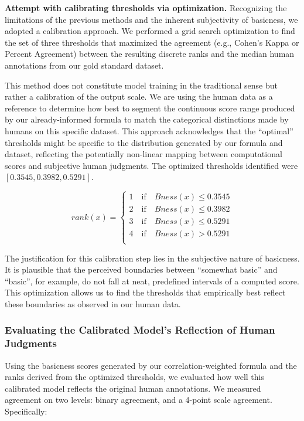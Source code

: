 \documentclass[preprint,12pt,authoryear]{elsarticle}
\begin{document}
\textbf{Attempt with calibrating thresholds via optimization.} Recognizing the limitations of the previous methods and the inherent subjectivity of basicness, we adopted a calibration approach. We performed a grid search optimization to find the set of three thresholds that maximized the agreement (e.g., Cohen's Kappa or Percent Agreement) between the resulting discrete ranks and the median human annotations from our gold standard dataset.

This method does not constitute model training in the traditional sense but rather a calibration of the output scale. We are using the human data as a reference to determine how best to segment the continuous score range produced by our already-informed formula to match the categorical distinctions made by humans on this specific dataset. This approach acknowledges that the ``optimal'' thresholds might be specific to the distribution generated by our formula and dataset, reflecting the potentially non-linear mapping between computational scores and subjective human judgments. The optimized thresholds identified were $[0.3545,0.3982,0.5291]$.

$$ 
rank(x) = 
\begin{cases}
	1 \quad \text{if} \quad Bness(x) \leq 0.3545 \\
	2 \quad \text{if} \quad Bness(x) \leq 0.3982 \\
	3 \quad \text{if} \quad Bness(x) \leq 0.5291 \\
	4 \quad \text{if} \quad Bness(x) > 0.5291    \\
\end{cases}
$$

The justification for this calibration step lies in the subjective nature of basicness. It is plausible that the perceived boundaries between ``somewhat basic'' and ``basic'', for example, do not fall at neat, predefined intervals of a computed score. This optimization allows us to find the thresholds that empirically best reflect these boundaries as observed in our human data.

\subsubsection{Evaluating the Calibrated Model's Reflection of Human Judgments}

Using the basicness scores generated by our correlation-weighted formula and the ranks derived from the optimized thresholds, we evaluated how well this calibrated model reflects the original human annotations. We measured agreement on two levels: binary agreement, and a 4-point scale agreement. Specifically:
\end{document}
